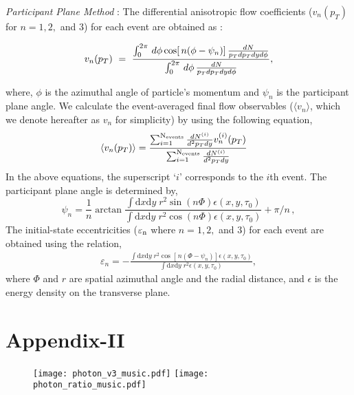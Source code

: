 \documentclass[aps,prc,twocolumn,floatfix,12pts,superscriptaddress]{revtex4}
\begin{document}
{{{	{\it Participant Plane Method} : The differential anisotropic flow coefficients ($v_n(p_T)$ for  $n=1,2,$ and $3$) for each event are obtained as :
	
	\begin{eqnarray}
		v_n (p_T) \ = \ \frac{\int_0^{2\pi} \, 
			d\phi\,{\rm cos} [\,n (\phi-\psi_{n})]\,\frac{dN}{p_T dp_T dy d\phi}}{\int_0^{2\pi}\,d\phi\,\frac{dN}{p_Tdp_Tdy d\phi}},
		\label{v2flow}
	\end{eqnarray}

	where,  $\phi$ is the azimuthal angle of particle's momentum and $\psi_n$ is the participant plane angle. 
	We calculate the event-averaged final flow observables ($\langle v_n\rangle$, which we denote hereafter as $v_n$ for simplicity) by using the following equation,
	\begin{eqnarray}
		&\langle v_n(p_T)\rangle =\frac {\sum_{i=1}^{\rm N_{events}}\frac{dN^{(i)}}{d^2p_Tdy} v_n^{(i)}(p_T)}{\sum_{i=1}^{\rm N_{events}}\frac{dN^{(i)}}{d^2p_Tdy}}
		\label{vnavg}
	\end{eqnarray}
	In the above equations, the superscript `$i$' corresponds to the $i$th  event.
	The participant plane angle is determined by,
	\begin{equation}
		\psi_{n} = \frac{1}{n} \arctan 
		\frac{\int \mathrm{d}x \mathrm{d}y \; r^2 \sin \left( n\Phi \right) \epsilon\left( x,y,\tau _{0}\right) } 
		{ \int \mathrm{d}x \mathrm{d}y \; r^2 \cos \left( n\Phi \right) \epsilon\left( x,y,\tau _{0}\right)}  + \pi/n \, ,
		\label{sai_nm}
	\end{equation}
	The initial-state eccentricities ($\rm \varepsilon_n$ where $n=1,2,$ and $3$)  for each event are obtained using the  relation,
	\begin{eqnarray}
		\varepsilon_{n}=-\frac{\int \mathrm{d}x \mathrm{d}y \; r^2 \cos [\,n (\Phi-\psi_n)]    \epsilon\left( x,y,\tau _{0}\right) } 
		{ \int \mathrm{d}x \mathrm{d}y \; r^2  \epsilon\left( x,y,\tau _{0}\right)},
		\label{e_mn1}
	\end{eqnarray}
	where $\Phi$ and $r$ are spatial azimuthal angle and the radial distance, and $\epsilon$ is the energy density on the transverse plane. 
	}
{\section*{Appendix-II}
	\begin{figure}[htbp!]
		\centering
		{\texttt{[image: photon\_v3\_music.pdf]}}
		{\texttt{[image: photon\_ratio\_music.pdf]}}

\end{figure}}}}
\end{document}
